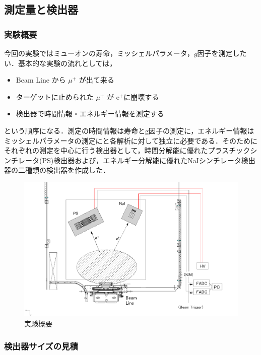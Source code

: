   \subsection{測定量と検出器}
  \subsubsection{実験概要}

今回の実験ではミューオンの寿命，ミッシェルパラメータ，$g$因子を測定したい．基本的な実験の流れとしては，
       \begin{itemize}
        \item Beam Line から $\mu ^+$ が出て来る
        \item ターゲットに止められた $\mu ^+$ が e$^+$に崩壊する
        \item 検出器で時間情報・エネルギー情報を測定する
        \end{itemize}
という順序になる．測定の時間情報は寿命とg$因子$の測定に，エネルギー情報はミッシェルパラメータの測定にと各解析に対して独立に必要である．そのためにそれぞれの測定を中心に行う検出器として，時間分解能に優れたプラスチックシンチレータ(PS)検出器および，エネルギー分解能に優れたNaIシンチレータ検出器の二種類の検出器を作成した．
       
    \begin{figure}[H]
      \centering
      \includegraphics[width=1\textwidth]{figure/hayakawa/lifetime.png}
      \caption{実験概要}
  \end{figure}

  \subsubsection{検出器サイズの見積}


